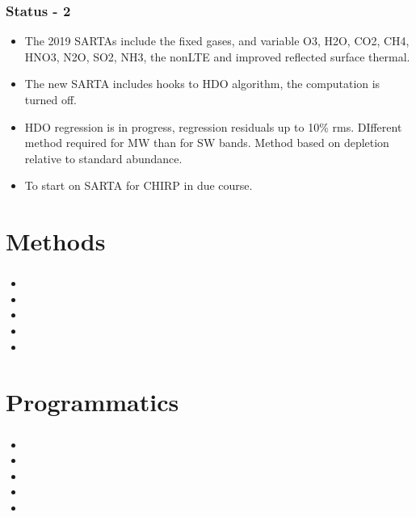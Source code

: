 \documentclass[10pt,t]{beamer}
\begin{document}
\begin{frame}
  \frametitle{Status - 2}
  \begin{itemize}
  \item The 2019 SARTAs include the fixed gases, and variable O3, H2O, CO2, CH4, HNO3, N2O, SO2, NH3, the nonLTE and improved reflected surface thermal. 
  \item The new SARTA includes hooks to HDO algorithm, the computation is turned off.
  \item HDO regression is in progress, regression residuals up to 10\% rms. DIfferent method required for MW than for SW bands. Method based on depletion relative to standard abundance.
  \item To start on SARTA for CHIRP in due course.
    
  \end{itemize}
\end{frame}

\section{Methods}
\begin{frame}
  \frametitle{}
  \begin{itemize}
  \item 
  \item 
  \item 
  \item 
  \item 
    
  \end{itemize}
\end{frame}

\section{Programmatics}
\begin{frame}
  \frametitle{}
  \begin{itemize}
  \item 
  \item 
  \item 
  \item 
  \item 
    
  \end{itemize}
\end{frame}
\end{document}
